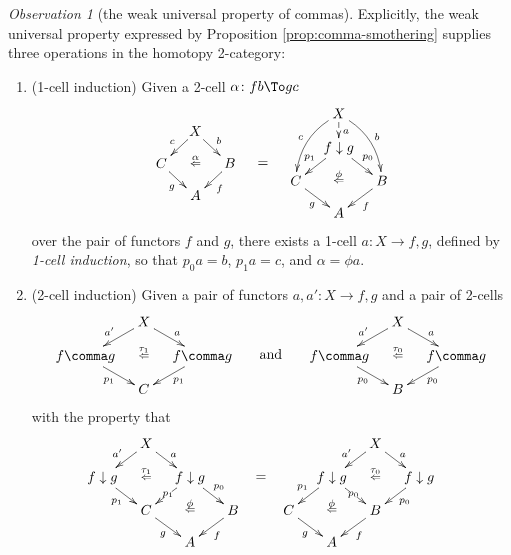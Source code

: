 \documentclass[12pt,reqno]{amsart}
\theoremstyle{plain}
\theoremstyle{definition}
\theoremstyle{remark}
\newtheorem{obs}[thm]{Observation}
\numberwithin{equation}{subsection}
\begin{document}
\begin{obs}[the weak universal property of commas]\label{obs:comma-UP}
Explicitly, the weak universal property expressed by Proposition \ref{prop:comma-smothering} supplies three operations in the homotopy 2-category:
  \begin{enumerate}[label=(\roman*)]
    \item (1-cell induction) Given a 2-cell $\alpha \colon fb \To gc$
\[    \vcenter{ \xymatrix@=10pt{
      & X \ar[dl]_{c} \ar[dr]^{b} \ar@{}[dd]|(.4){\alpha}|{\Leftarrow}  \\ 
      C \ar[dr]_g & & B \ar[dl]^f \\ 
      & A}} \quad =\quad \vcenter{     \xymatrix@=10pt{ & X \ar@{-->}[d]^{a} \ar@/^2ex/[ddr]^b \ar@/_2ex/[ddl]_c \\ 
      & f \downarrow g \ar[dl]_{p_1} \ar[dr]^{p_0} \ar@{}[dd]|(.4){\phi}|{\Leftarrow}  \\ 
      C \ar[dr]_g & & B \ar[dl]^f \\ 
      & A}}
\] 
over the pair of functors $f$ and $g$, there exists a 1-cell $a\colon X\to f\comma g$, defined by \emph{1-cell induction}, so that $p_0a = b$, $p_1a = c$, and $\alpha = \phi a$.
    \item (2-cell induction) Given a pair of functors $a,a'\colon X\to f\comma g$ and a pair of 2-cells 
\[
    \vcenter{\xymatrix@=10pt{
      & {X}\ar[dl]_{a'}\ar[dr]^{a}
      \ar@{}[dd]|(.4){\tau_1}|{\Leftarrow} & \\
      {f\comma g}\ar[dr]_{p_1} & & 
      {f\comma g}\ar[dl]^{p_1} \\
      & C &
    }}
    \mkern30mu\text{and}\mkern30mu
    \vcenter{\xymatrix@=10pt{
      & {X}\ar[dl]_{a'}\ar[dr]^{a}
      \ar@{}[dd]|(.4){\tau_0}|{\Leftarrow} & \\
      {f\comma g}\ar[dr]_{p_0} & & 
      {f\comma g}\ar[dl]^{p_0} \\
      & B &
    }}
\]
  with the property that 
\[
      \xymatrix@=10pt{ & X \ar[dl]_{a'} \ar[dr]^a \ar@{}[dd]|(.4){\tau_1}|{\Leftarrow} & &  & \ar@{}[dd]|{\displaystyle =} & &  & X \ar[dl]_{a'} \ar[dr]^a  \ar@{}[dd]|(.4){\tau_0}|{\Leftarrow} \\ f \downarrow g  \ar[dr]_{p_1} & & f \downarrow g \ar[dl]|{p_1} \ar[dr]^{p_0}   \ar@{}[dd]|(.4){\phi}|{\Leftarrow} & & & &   f \downarrow g \ar[dl]_{p_1} \ar[dr]|{p_0}  \ar@{}[dd]|(.4){\phi}|{\Leftarrow}  & & f \downarrow g \ar[dl]^{p_0} \\ & C \ar[dr]_g & & B \ar[dl]^f & & C \ar[dr]_g & & B \ar[dl]^f & &  \\ & & A & &  &  & A}
\]
\end{enumerate}
\end{obs}
\end{document}
